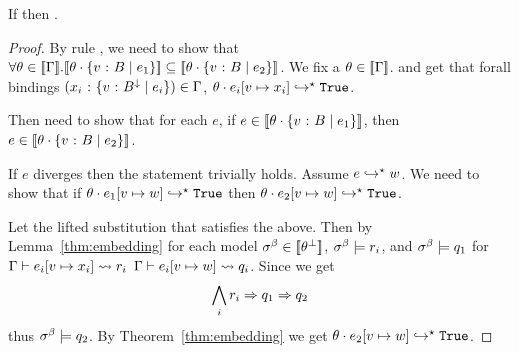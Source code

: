 \begin{lemma}
If 
then .
\end{lemma}
\begin{proof}
By rule \rsubbase, we need to show that
$\forall \sub\in\interp{\env}.
  \interp{\applysub{\sub}{\tref{v}{\btyp}{\refa_1}}}
  \subseteq
  \interp{\applysub{\sub}{\tref{v}{\btyp}{\refa_2}}}$.
%
We fix a $\sub\in\interp{\env}$.
and get that forall bindings
$(\tbind{x_i}{\tref{v}{\btyp^{\downarrow}}{\refa_i}}) \in \env$,
$\evalsto{\applysub{\sub}{e_i\subst{v}{x_i}}}{\etrue}$.

Then need to show that for each $e$,
if $e \in \interp{\applysub{\sub}{\tref{v}{\btyp}{\refa_1}}}$,
then $e \in \interp{\applysub{\sub}{\tref{v}{\btyp}{\refa_2}}}$.

If $e$ diverges then the statement trivially holds.
Assume $\evalsto{e}{w}$.
We need to show that
if $\evalsto{\applysub{\sub}{e_1\subst{v}{w}}}{\etrue}$
then $\evalsto{\applysub{\sub}{e_2\subst{v}{w}}}{\etrue}$.

Let \vsub the lifted substitution that satisfies the above.
Then  by Lemma~\ref{thm:embedding}
for each model $\bmodel \in \interp{\vsub}$,
$\bmodel\models\pred_i$, and $\bmodel\models q_1$
for
$\tologicshort{\env}{e_i\subst{v}{x_i}}{\btyp}{\pred_i}{\embed{\btyp}}{\smtenv_i}{\axioms_i}$
$\tologicshort{\env}{e_i\subst{v}{w}}{\btyp}{q_i}{\embed{\btyp}}{\smtenv_i}{\beta_i}$.
%
Since  we get
$$
\bigwedge_i \pred_i
\Rightarrow q_1 \Rightarrow q_2
$$
thus $\bmodel\models q_2$.
%
By Theorem~\ref{thm:embedding} we get $\evalsto{\applysub{\sub}{\refa_2\subst{v}{w}}}{\etrue}$.
\end{proof}

